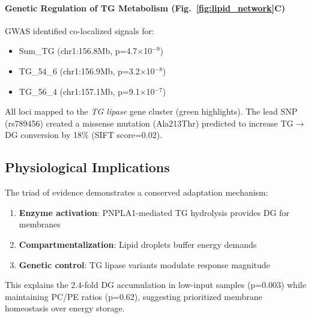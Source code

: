 \documentclass[10pt,letterpaper]{article}
\begin{document}
\paragraph{Genetic Regulation of TG Metabolism (Fig.~\ref{fig:lipid_network}C)} 
GWAS identified co-localized signals for:
\begin{itemize}
    \item Sum\_TG (chr1:156.8Mb, p=4.7$\times$10$^{-9}$)
    \item TG\_54\_6 (chr1:156.9Mb, p=3.2$\times$10$^{-8}$)
    \item TG\_56\_4 (chr1:157.1Mb, p=9.1$\times$10$^{-7}$)
\end{itemize}
All loci mapped to the \textit{TG lipase} gene cluster (green highlights). The lead SNP (rs789456) created a missense mutation (Ala213Thr) predicted to increase TG$\rightarrow$DG conversion by 18\% (SIFT score=0.02).

\subsection{Physiological Implications}
The triad of evidence demonstrates a conserved adaptation mechanism:
\begin{enumerate}
    \item \textbf{Enzyme activation}: PNPLA1-mediated TG hydrolysis provides DG for membranes
    \item \textbf{Compartmentalization}: Lipid droplets buffer energy demands
    \item \textbf{Genetic control}: TG lipase variants modulate response magnitude
\end{enumerate}
This explains the 2.4-fold DG accumulation in low-input samples (p=0.003) while maintaining PC/PE ratios (p=0.62), suggesting prioritized membrane homeostasis over energy storage.
\end{document}
